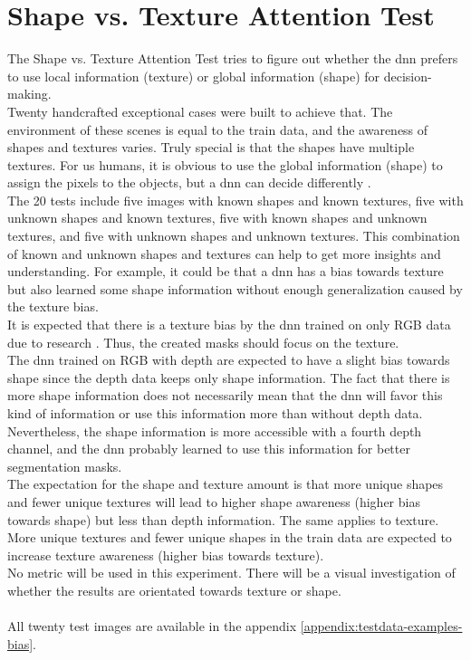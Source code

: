 	\section{Shape vs. Texture Attention Test}
	\label{sec:shape-texutre-attention-test}
		The Shape vs. Texture Attention Test tries to figure out whether the \ac{dnn} prefers to use local information (texture) or global information (shape) for decision-making.\\
		Twenty handcrafted exceptional cases were built to achieve that. The environment of these scenes is equal to the train data, and the awareness of shapes and textures varies. Truly special is that the shapes have multiple textures. For us humans, it is obvious to use the global information (shape) to assign the pixels to the objects, but a \ac{dnn} can decide differently \cite{Geirhos2020}\cite{Mohla2022}\cite{Baker2020}.\\
		The 20 tests include five images with known shapes and known textures, five with unknown shapes and known textures, five with known shapes and unknown textures, and five with unknown shapes and unknown textures. This combination of known and unknown shapes and textures can help to get more insights and understanding. For example, it could be that a \ac{dnn} has a bias towards texture but also learned some shape information without enough generalization caused by the texture bias.\\
		It is expected that there is a texture bias by the \ac{dnn} trained on only RGB data due to research \cite{Theodoridis2022}. Thus, the created masks should focus on the texture. \\
		The \ac{dnn} trained on RGB with depth are expected to have a slight bias towards shape since the depth data keeps only shape information. The fact that there is more shape information does not necessarily mean that the \ac{dnn} will favor this kind of information or use this information more than without depth data. Nevertheless, the shape information is more accessible with a fourth depth channel, and the \ac{dnn} probably learned to use this information for better segmentation masks.\\
		The expectation for the shape and texture amount is that more unique shapes and fewer unique textures will lead to higher shape awareness (higher bias towards shape) but less than depth information. The same applies to texture. More unique textures and fewer unique shapes in the train data are expected to increase texture awareness (higher bias towards texture). \\
		No metric will be used in this experiment. There will be a visual investigation of whether the results are orientated towards texture or shape.\\
		\\
		All twenty test images are available in the appendix \ref{appendix:testdata-examples-bias}.
	
